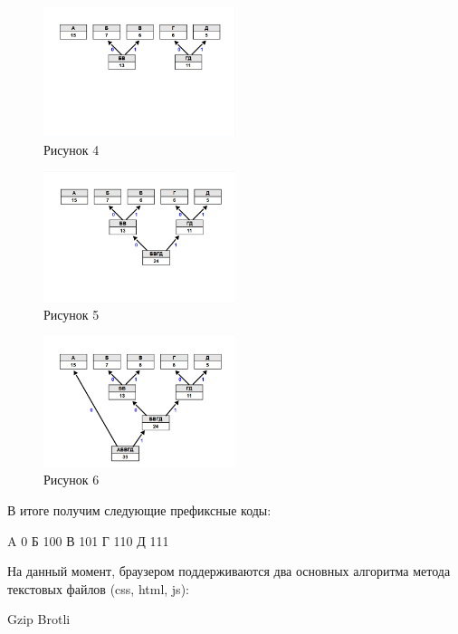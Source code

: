 \documentclass[12pt]{article}
\begin{document}
    \begin{figure}[h!]
        \centering
        \includegraphics[width=0.5\textwidth]{../images/haffman/phase2.png}
        \caption{Рисунок 4}
    \end{figure}

    \begin{figure}[h!]
        \centering
        \includegraphics[width=0.5\textwidth]{../images/haffman/phase3.png}
        \caption{Рисунок 5}
    \end{figure}

    \begin{figure}[h!]
        \centering
        \includegraphics[width=0.5\textwidth]{../images/haffman/phase4.png}
        \caption{Рисунок 6}
    \end{figure}

    В итоге получим следующие префиксные коды:

    A 0
    Б 100
    В 101
    Г 110
    Д 111

    На данный момент, браузером поддерживаются два основных алгоритма метода текстовых файлов (css, html, js):

    Gzip
    Brotli
\end{document}
